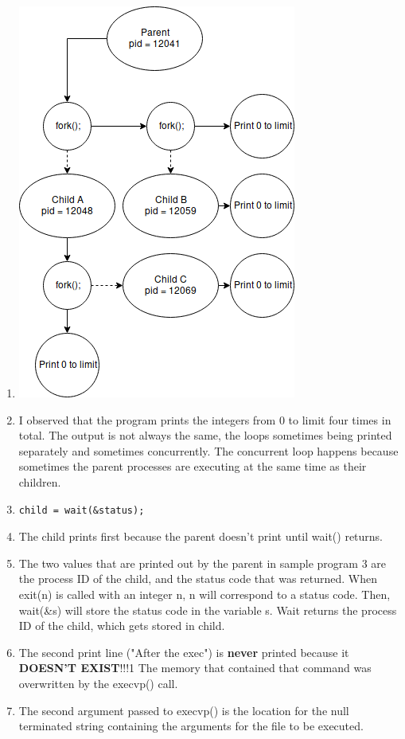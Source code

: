 \documentclass{article}
\begin{document}
\begin{enumerate}
    \item
    \includegraphics[scale=0.6]{index.png}
    
    \item I observed that the program prints the integers from 0 to limit four times in total. The output is not always the same, the loops sometimes being printed separately and sometimes concurrently. The concurrent loop happens because sometimes the parent processes are executing at the same time as their children.
    
    \item
    \begin{verbatim}
child = wait(&status);\end{verbatim}
    \item The child prints first  because the parent doesn't print until wait() returns.
    
    \item The two values that are printed out by the parent in sample program 3 are the process ID of the child, and the status code that was returned. When exit(n) is called with an integer n, n will correspond to a status code. Then, wait(\&s) will store the status code in the variable s. Wait returns the process ID of the child, which gets stored in child.
    
    \item The second print line ("After the exec") is \textbf{never} printed because it \textbf{DOESN'T EXIST}!!!1 The memory that contained that command was overwritten by the execvp() call.
    
    \item The second argument passed to execvp() is the location for the null terminated string containing the arguments for the file to be executed.
    
    
    
    
\end{enumerate}
\end{document}
